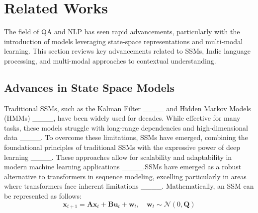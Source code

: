 \section{Related Works}
\label{sec:related}

The field of QA and NLP has seen rapid advancements, particularly with the introduction of models leveraging state-space representations and multi-modal learning. This section reviews key advancements related to SSMs, Indic language processing, and multi-modal approaches to contextual understanding.

\subsection{Advances in State Space Models}
Traditional SSMs, such as the Kalman Filter ____ and Hidden Markov Models (HMMs) ____, have been widely used for decades. While effective for many tasks, these models struggle with long-range dependencies and high-dimensional data ____. To overcome these limitations, SSMs have emerged, combining the foundational principles of traditional SSMs with the expressive power of deep learning ____. These approaches allow for scalability and adaptability in modern machine learning applications ____.SSMs have emerged as a robust alternative to transformers in sequence modeling, excelling particularly in areas where transformers face inherent limitations ____. Mathematically, an SSM can be represented as follows:
\begin{equation}
    {
        \mathbf{x}_{t+1} = \mathbf{A} \mathbf{x}_t + \mathbf{B} \mathbf{u}_t + \mathbf{w}_t, \quad \mathbf{w}_t \sim \mathcal{N}(0, \mathbf{Q})
    } 
    \label{eq:ssm_equations}
\end{equation}

